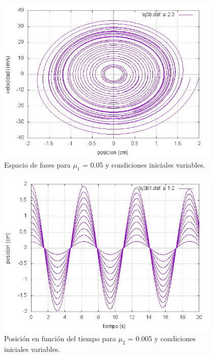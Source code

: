 \documentclass[a4paper,12pt]{article}
\begin{document}
\begin{itemize}
\begin{figure}[H]
\begin{center}
\includegraphics[height=8cm]{grafico_ej3b_xVSv.jpg}
\caption[width=5cm]{Espacio de fases para $\mu_1$ = 0.05 y condiciones iniciales variables.}
\end{center}
\end{figure}

\begin{figure}[H]
\begin{center}
\includegraphics[height=8cm]{grafico_ej3b1_xVSt.jpg}
\caption[width=5cm]{Posici\'on en funci\'on del tiempo para $\mu_2$ = 0.005 y condiciones iniciales variables.}
\end{center}
\end{figure}


\end{itemize}
\end{document}
